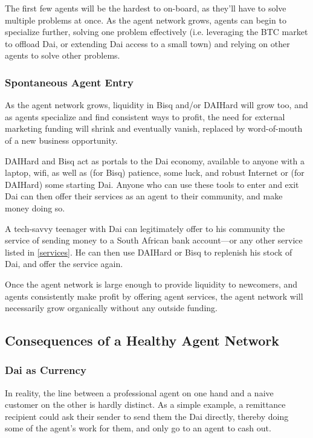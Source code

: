 \documentclass{article}
\begin{document}
The first few agents will be the hardest to on-board, as they'll have to solve multiple problems at once. As the agent network grows, agents can begin to specialize further, solving one problem effectively (i.e. leveraging the BTC market to offload Dai, or extending Dai access to a small town) and relying on other agents to solve other problems.

\subsubsection{Spontaneous Agent Entry} \label{spontaneous}

As the agent network grows, liquidity in Bisq and/or DAIHard will grow too, and as agents specialize and find consistent ways to profit, the need for external marketing funding will shrink and eventually vanish, replaced by word-of-mouth of a new business opportunity.

DAIHard and Bisq act as portals to the Dai economy, available to anyone with a laptop, wifi, as well as (for Bisq) patience, some luck, and robust Internet or (for DAIHard) some starting Dai. Anyone who can use these tools to enter and exit Dai can then offer their services as an agent to their community, and make money doing so.

A tech-savvy teenager with Dai can legitimately offer to his community the service of sending money to a South African bank account---or any other service listed in \ref{services}. He can then use DAIHard or Bisq to replenish his stock of Dai, and offer the service again.

Once the agent network is large enough to provide liquidity to newcomers, and agents consistently make profit by offering agent services, the agent network will necessarily grow organically without any outside funding.

\subsection{Consequences of a Healthy Agent Network} \label{consequences}

\subsubsection{Dai as Currency} \label{currency}

In reality, the line between a professional agent on one hand and a naive customer on the other is hardly distinct. As a simple example, a remittance recipient could ask their sender to send them the Dai directly, thereby doing some of the agent's work for them, and only go to an agent to cash out.
\end{document}
